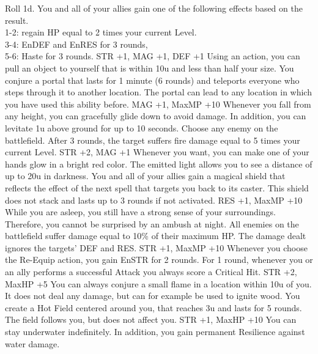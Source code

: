 {Roll 1d. You and all of your allies gain one of the following effects based on the result.\\ 1-2: regain HP equal to 2 times your current Level.\\ 3-4: EnDEF and EnRES for 3 rounds,\\ 5-6: Haste for 3 rounds.}
{STR +1, MAG +1, DEF +1}
%
\vfill
%
{Using an action, you can pull an object to yourself that is within 10u and less than half your size.}
{You conjure a portal that lasts for 1 minute (6 rounds) and teleports everyone who steps through it to another location. The portal can lead to any location in which you have used this ability before.}
{MAG +1, MaxMP +10}
%
\vfill
%
{Whenever you fall from any height, you can gracefully glide down to avoid damage. In addition, you can levitate 1u above ground for up to 10 seconds.}
{Choose any enemy on the battlefield. After 3 rounds, the target suffers fire damage equal to 5 times your current Level.}
{STR +2, MAG +1}
%
\clearpage
%
{Whenever you want, you can make one of your hands glow in a bright red color. The emitted light allows you to see a distance of up to 20u in darkness.}
{You and all of your allies gain a magical shield that reflects the effect of the next spell that targets you back to its caster. This shield does not stack and lasts up to 3 rounds if not activated.}
{RES +1, MaxMP +10}
%
\vfill
%
{While you are asleep, you still have a strong sense of your surroundings. Therefore, you cannot be surprised by an ambush at night.}
{All enemies on the battlefield suffer damage equal to 10\% of their maximum HP. The damage dealt ignores the targets' DEF and RES.}
{STR +1, MaxMP +10}
%
\vfill
%
{Whenever you choose the Re-Equip action, you gain EnSTR for 2 rounds.}
{For 1 round, whenever you or an ally performs a successful Attack you always score a Critical Hit.}
{STR +2, MaxHP +5}
%
\vfill
%
{You can always conjure a small flame in a location within 10u of you. It does not deal any damage, but can for example be used to ignite wood.}
{You create a Hot Field centered around you, that reaches 3u and lasts for 5 rounds. The field follows you, but does not affect you.}
{STR +1, MaxHP +10}
%
\vfill
%
{You can stay underwater indefinitely. In addition, you gain permanent Resilience against water damage.}
